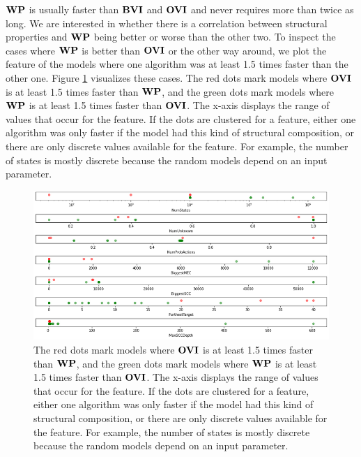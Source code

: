 $\WP$ is usually faster than $\mathbf{BVI}$ and $\OVI$ and never requires more than twice as long.
We are interested in whether there is a correlation between structural properties and $\WP$ being better or worse than the other two.
To inspect the cases where $\WP$ is better than $\OVI$ or the other way around, we plot the feature of the models where one algorithm was at least
1.5 times faster than the other one. Figure \ref{fig:WPvsOVIon1DFeatureScatter} visualizes these cases. 
The red dots mark models where $\OVI$ is at least 1.5 times faster than $\WP$, and the green dots mark models where $\WP$ is at least 1.5 times faster than $\OVI$.
The x-axis displays the range of values that occur for the feature. 
If the dots are clustered for a feature, either one algorithm was only faster if the model had this kind of structural composition, 
or there are only discrete values available for the feature. For example, the number of states is mostly discrete because the random models depend on an input parameter.

\begin{figure}[t]
    \centering
    \includegraphics[width=1\textwidth]{figures/WPvsOVIon1DFeatureScatter.png}
    \caption[$\WP$ compared to $\OVI$]{
        The red dots mark models where $\OVI$ is at least 1.5 times faster than $\WP$, and the green dots mark models where $\WP$ is at least 1.5 times faster than $\OVI$.
        The x-axis displays the range of values that occur for the feature. 
        If the dots are clustered for a feature, either one algorithm was only faster if the model had this kind of structural composition, 
        or there are only discrete values available for the feature. For example, the number of states is mostly discrete because the random models depend on an input parameter.
    }
    \label{fig:WPvsOVIon1DFeatureScatter}
\end{figure}

